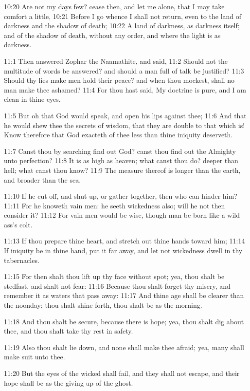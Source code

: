 10:20 Are not my days few? cease then, and let me alone, that I may
take comfort a little, 10:21 Before I go whence I shall not return,
even to the land of darkness and the shadow of death; 10:22 A land of
darkness, as darkness itself; and of the shadow of death, without any
order, and where the light is as darkness.

11:1 Then answered Zophar the Naamathite, and said, 11:2 Should not
the multitude of words be answered? and should a man full of talk be
justified?  11:3 Should thy lies make men hold their peace? and when
thou mockest, shall no man make thee ashamed?  11:4 For thou hast
said, My doctrine is pure, and I am clean in thine eyes.

11:5 But oh that God would speak, and open his lips against thee; 11:6
And that he would shew thee the secrets of wisdom, that they are
double to that which is! Know therefore that God exacteth of thee less
than thine iniquity deserveth.

11:7 Canst thou by searching find out God? canst thou find out the
Almighty unto perfection?  11:8 It is as high as heaven; what canst
thou do? deeper than hell; what canst thou know?  11:9 The measure
thereof is longer than the earth, and broader than the sea.

11:10 If he cut off, and shut up, or gather together, then who can
hinder him?  11:11 For he knoweth vain men: he seeth wickedness also;
will he not then consider it?  11:12 For vain men would be wise,
though man be born like a wild ass's colt.

11:13 If thou prepare thine heart, and stretch out thine hands toward
him; 11:14 If iniquity be in thine hand, put it far away, and let not
wickedness dwell in thy tabernacles.

11:15 For then shalt thou lift up thy face without spot; yea, thou
shalt be stedfast, and shalt not fear: 11:16 Because thou shalt forget
thy misery, and remember it as waters that pass away: 11:17 And thine
age shall be clearer than the noonday: thou shalt shine forth, thou
shalt be as the morning.

11:18 And thou shalt be secure, because there is hope; yea, thou shalt
dig about thee, and thou shalt take thy rest in safety.

11:19 Also thou shalt lie down, and none shall make thee afraid; yea,
many shall make suit unto thee.

11:20 But the eyes of the wicked shall fail, and they shall not
escape, and their hope shall be as the giving up of the ghost.

